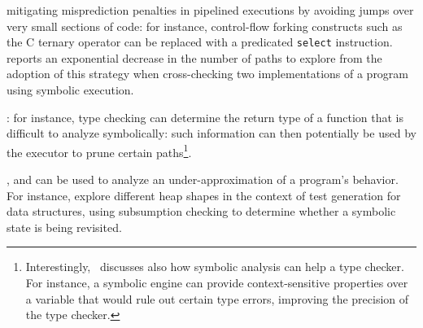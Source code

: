 
 mitigating misprediction penalties in pipelined executions by avoiding jumps over very small sections of code: for instance, control-flow forking constructs such as the C ternary operator can be replaced with a predicated {\tt select} instruction. \cite{CCK-EUROSYS11} reports an exponential decrease in the number of paths to explore from the adoption of this strategy when cross-checking two implementations of a program using symbolic execution. %

:  for instance, type checking can determine the return type of a function that is difficult to analyze symbolically: such information can then potentially be used by the executor to prune certain paths\footnote{Interestingly,~\cite{KCF-PLDI10} discusses also how symbolic analysis can help a type checker. For instance, a symbolic engine can provide context-sensitive properties over a variable that would rule out certain type errors, improving the precision of the type checker.}.

, and can be used to analyze an under-approximation of a program's behavior. For instance, \cite{APV-SPIN06,VPP-ISSTA06} explore different heap shapes in the context of test generation for data structures, using subsumption checking to determine whether a symbolic state is being revisited. %

